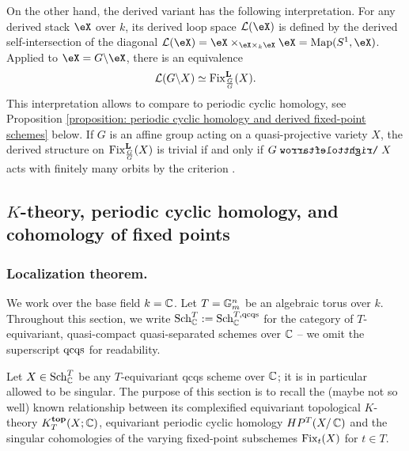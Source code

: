 On the other hand, the derived variant has the following interpretation. 
For any derived stack $\eX$ over $k$, its derived loop space $\dL (\eX)$ is defined by the derived self-intersection of the diagonal $\dL (\eX) = \eX \times_{\eX \times_k \eX} \eX = \Map(S^1, \eX)$. Applied to $\eX = G \backslash \eX$, there is an equivalence
\begin{equation*}
    \operatorname{\mathcal{L}} (G \backslash X) \simeq \operatorname{Fix}^{\mathbf{L}}_{\frac{G}{G}}(X).
\end{equation*}
This interpretation allows to compare to periodic cyclic homology, see Proposition \ref{proposition: periodic cyclic homology and derived fixed-point schemes} below. If $G$ is an affine group acting on a quasi-projective variety $X$, the derived structure on $\operatorname{Fix}^{\mathbf{L}}_{\frac{G}{G}}(X)$ is trivial if and only if $G\acts X$ acts with finitely many orbits by the criterion \cite[Proposition 3.3]{BN13}.








\subsection{\texorpdfstring{$K$}{K}-theory, periodic cyclic homology, and cohomology of fixed points}\label{section: K-theory and HP and cohomology of fixed points}

\subsubsection{Localization theorem.}
We work over the base field $k=\operatorname{\mathbb{C}}$. Let $T = \mathbb{G}_m^{n}$ be an algebraic torus over $k$. 
Throughout this section, we write $\operatorname{Sch}^T_{\operatorname{\mathbb{C}}} := \operatorname{Sch}^{T, \mathrm{qcqs}}_{\operatorname{\mathbb{C}}}$ for the category of $T$-equivariant, quasi-compact quasi-separated schemes over $\operatorname{\mathbb{C}}$  -- we omit the superscript $\mathrm{qcqs}$ for readability. 


Let $X \in \operatorname{Sch}^{T}_{\operatorname{\mathbb{C}}}$ be any $T$-equivariant qcqs scheme over $\operatorname{\mathbb{C}}$; it is in particular allowed to be singular. 
The purpose of this section is to recall the (maybe not so well) known relationship between its complexified equivariant topological $K$-theory $K^{\mathbf{top}}_T(X; \operatorname{\mathbb{C}})$, equivariant periodic cyclic homology $HP^T(X / \operatorname{\mathbb{C}})$ and the singular cohomologies of the varying fixed-point subschemes $\operatorname{Fix}_t(X)$ for $t \in T$.

